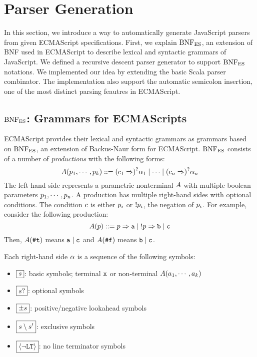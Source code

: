 \section{Parser Generation}

In this section, we introduce a way to automatically generate JavaScript parsers
from given ECMAScript specifications. First, we explain \( \text{BNF}_{\text{ES}} \), an extension
of BNF used in ECMAScript to describe lexical and syntactic grammars of JavaScript.
We defined a recursive descent parser generator to support \( \text{BNF}_{\text{ES}} \) notations.
We implemented our idea by extending the basic Scala parser combinator.
The implementation also support the automatic semicolon insertion,
one of the most distinct parsing feautres in ECMAScript.

\subsection{\( \text{BNF}_{\text{ES}} \): Grammars for ECMAScripts}

ECMAScript provides their lexical and syntactic grammars as grammars
based on \( \text{BNF}_{\text{ES}} \), an extension of Backus-Naur form for ECMAScript.
\( \text{BNF}_{\text{ES}} \) consists of a number of \textit{productions}
with the following forms:
\[
  A(p_1, \cdots, p_k) ::=
  (c_1 \Rightarrow)^? \alpha_1 \mid
  \cdots \mid
  (c_n \Rightarrow)^? \alpha_n
\]
The left-hand side represents a parametric nonterminal \( A \) with
multiple boolean parameters \( p_1, \cdots, p_n \).
A production has multiple right-hand sides with optional conditions.
The condition \( c \) is either \( p_i \) or \( ! p_i \),
the negation of \( p_i \).
For example, consider the following production:
\[
  A(p) ::= p \Rightarrow \texttt{a}
  \mid \; !p \Rightarrow \texttt{b}
  \mid  \texttt{c}
\]
Then, \( A(\texttt{\#t}) \) means \( \texttt{a} \mid \texttt{c} \)
and \( A(\texttt{\#f}) \) means \( \texttt{b} \mid \texttt{c} \).

Each right-hand side \( \alpha \) is a sequence of the following symbols:
\begin{itemize}
  \item \( \boxed{s} \):
    basic symbols; terminal \( \texttt{x} \) or
    non-terminal \( A(a_1, \cdots, a_k) \)
  \item \( \boxed{s?} \): optional symbols
  \item \( \boxed{\pm s} \): positive/negative lookahead symbols
  \item \( \boxed{s \setminus s'} \): exclusive symbols
  \item \( \boxed{\left<\neg\texttt{LT}\right>} \): no line terminator symbols
\end{itemize}


